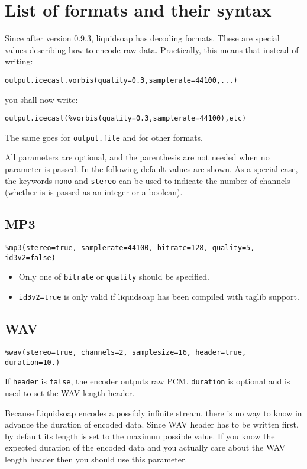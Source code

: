 \section{List of formats and their syntax}
Since after version 0.9.3, liquidsoap has decoding formats. These are
special values describing how to encode raw data.
Practically, this means that instead of writing:

\begin{verbatim}
output.icecast.vorbis(quality=0.3,samplerate=44100,...)
\end{verbatim}
you shall now write:

\begin{verbatim}
output.icecast(%vorbis(quality=0.3,samplerate=44100),etc)
\end{verbatim}
The same goes for \verb+output.file+ and for other formats.


All parameters are optional, and the parenthesis are not needed
when no parameter is passed. In the following default values
are shown.
As a special case, the keywords \verb+mono+ and \verb+stereo+ can be used to indicate
the number of channels (whether is is passed as an integer or a boolean).

\subsection{MP3}
\begin{verbatim}
%mp3(stereo=true, samplerate=44100, bitrate=128, quality=5, id3v2=false)
\end{verbatim}
\begin{itemize}
\item Only one of \verb+bitrate+ or \verb+quality+ should be specified.
\item \verb+id3v2=true+ is only valid if liquidsoap has been compiled with taglib support.

\end{itemize}
\subsection{WAV}
\begin{verbatim}
%wav(stereo=true, channels=2, samplesize=16, header=true, duration=10.)
\end{verbatim}
If \verb+header+ is \verb+false+, the encoder outputs raw PCM. \verb+duration+ is optional
and is used to set the WAV length header.

Because Liquidsoap encodes a possibly infinite stream, there
is no way to know in advance the duration of encoded data. Since WAV header
has to be written first, by default its length is set to the maximun possible 
value. If you know the expected duration of the encoded data and you actually 
care about the WAV length header then you should use this parameter.

